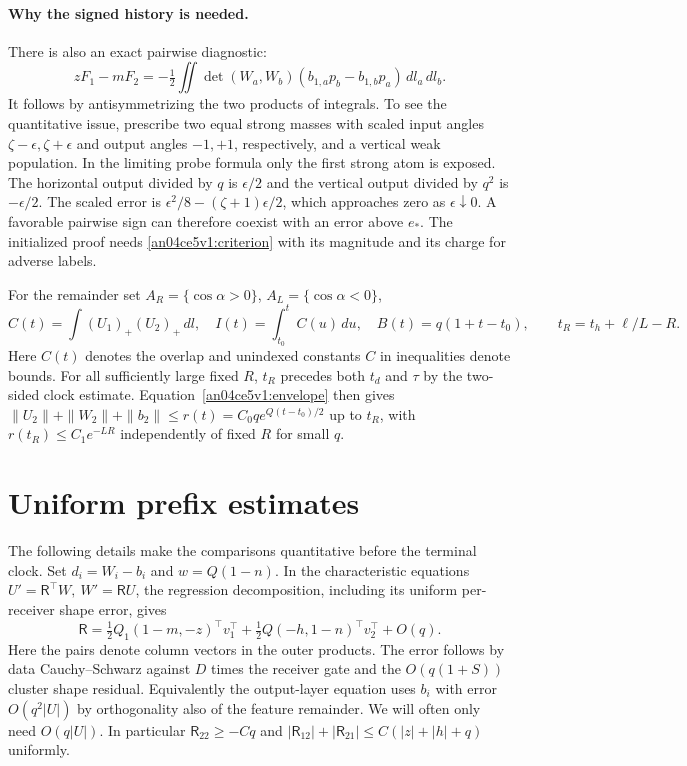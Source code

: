 \documentclass[11pt]{article}
\newcommand{\dd}{\,dl}
\begin{document}
\paragraph{Why the signed history is needed.}
There is also an exact pairwise diagnostic:
\[
 zF_1-mF_2=-\tfrac12\iint\det(W_a,W_b)
   (b_{1,a}p_b-b_{1,b}p_a)\,dl_a\,dl_b .
\]
It follows by antisymmetrizing the two products of integrals. To see the quantitative issue, prescribe two equal strong masses with scaled input angles $\zeta-\epsilon,\zeta+\epsilon$ and output angles $-1,+1$, respectively, and a vertical weak population. In the limiting probe formula only the first strong atom is exposed. The horizontal output divided by $q$ is $\epsilon/2$ and the vertical output divided by $q^2$ is $-\epsilon/2$. The scaled error is $\epsilon^2/8-(\zeta+1)\epsilon/2$, which approaches zero as $\epsilon\downarrow0$. A favorable pairwise sign can therefore coexist with an error above $e_*$. The initialized proof needs \eqref{an04ce5v1:criterion} with its magnitude and its charge for adverse labels.

For the remainder set $A_R=\{\cos\alpha>0\}$, $A_L=\{\cos\alpha<0\}$,
\[
 C(t)=\int (U_1)_+(U_2)_+\dd,\quad I(t)=\int_{t_0}^t C(u)\,du,\quad
 B(t)=q(1+t-t_0),\qquad t_R=t_h+\ell/L-R .
\]
Here $C(t)$ denotes the overlap and unindexed constants $C$ in inequalities denote bounds. For all sufficiently large fixed $R$, $t_R$ precedes both $t_d$ and $\tau$ by the two-sided clock estimate. Equation~\eqref{an04ce5v1:envelope} then gives $\|U_2\|+\|W_2\|+\|b_2\|\le r(t)=C_0q e^{Q(t-t_0)/2}$ up to $t_R$, with $r(t_R)\le C_1e^{-LR}$ independently of fixed $R$ for small $q$.

\section{Uniform prefix estimates}\label{an04ce5v1:prefixsec}
The following details make the comparisons quantitative before the
terminal clock. Set $d_i=W_i-b_i$ and $w=Q(1-n)$. In the characteristic
equations $U'=\mathsf R^\top W,\ W'=\mathsf R U$, the regression
decomposition, including its uniform per-receiver shape error, gives
\[
 \mathsf R=\tfrac12 Q_1(1-m,-z)^\top v_1^\top+
            \tfrac12 Q(-h,1-n)^\top v_2^\top+O(q).
\]
Here the pairs denote column vectors in the outer products. The error
follows by data Cauchy--Schwarz against $D$ times the receiver gate and
the $O(q(1+S))$ cluster shape residual. Equivalently the output-layer
equation uses $b_i$ with error $O(q^2|U|)$ by orthogonality also of the
feature remainder. We will often only need $O(q|U|)$.
In particular $\mathsf R_{22}\ge-Cq$ and
$|\mathsf R_{12}|+|\mathsf R_{21}|\le C(|z|+|h|+q)$ uniformly.
\end{document}
